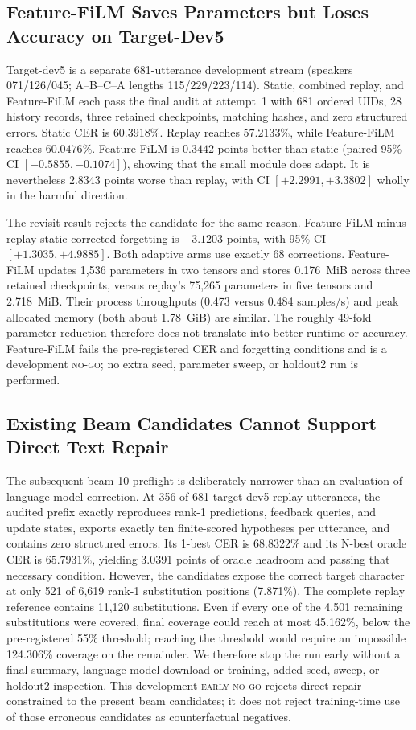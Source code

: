 \subsection{Feature-FiLM Saves Parameters but Loses Accuracy on Target-Dev5}

Target-dev5 is a separate 681-utterance development stream (speakers 071/126/045; A--B--C--A lengths 115/229/223/114). Static, combined replay, and Feature-FiLM each pass the final audit at attempt~1 with 681 ordered UIDs, 28 history records, three retained checkpoints, matching hashes, and zero structured errors. Static CER is $60.3918\%$. Replay reaches $57.2133\%$, while Feature-FiLM reaches $60.0476\%$. Feature-FiLM is $0.3442$ points better than static (paired 95\% CI $[-0.5855,-0.1074]$), showing that the small module does adapt. It is nevertheless $2.8343$ points worse than replay, with CI $[+2.2991,+3.3802]$ wholly in the harmful direction.

The revisit result rejects the candidate for the same reason. Feature-FiLM minus replay static-corrected forgetting is $+3.1203$ points, with 95\% CI $[+1.3035,+4.9885]$. Both adaptive arms use exactly 68 corrections. Feature-FiLM updates 1,536 parameters in two tensors and stores 0.176~MiB across three retained checkpoints, versus replay's 75,265 parameters in five tensors and 2.718~MiB. Their process throughputs (0.473 versus 0.484 samples/s) and peak allocated memory (both about 1.78~GiB) are similar. The roughly 49-fold parameter reduction therefore does not translate into better runtime or accuracy. Feature-FiLM fails the pre-registered CER and forgetting conditions and is a development \textsc{no-go}; no extra seed, parameter sweep, or holdout2 run is performed.

\subsection{Existing Beam Candidates Cannot Support Direct Text Repair}

The subsequent beam-10 preflight is deliberately narrower than an evaluation of language-model correction. At 356 of 681 target-dev5 replay utterances, the audited prefix exactly reproduces rank-1 predictions, feedback queries, and update states, exports exactly ten finite-scored hypotheses per utterance, and contains zero structured errors. Its 1-best CER is $68.8322\%$ and its N-best oracle CER is $65.7931\%$, yielding 3.0391 points of oracle headroom and passing that necessary condition. However, the candidates expose the correct target character at only 521 of 6,619 rank-1 substitution positions (7.871\%). The complete replay reference contains 11,120 substitutions. Even if every one of the 4,501 remaining substitutions were covered, final coverage could reach at most 45.162\%, below the pre-registered 55\% threshold; reaching the threshold would require an impossible 124.306\% coverage on the remainder. We therefore stop the run early without a final summary, language-model download or training, added seed, sweep, or holdout2 inspection. This development \textsc{early no-go} rejects direct repair constrained to the present beam candidates; it does not reject training-time use of those erroneous candidates as counterfactual negatives.

